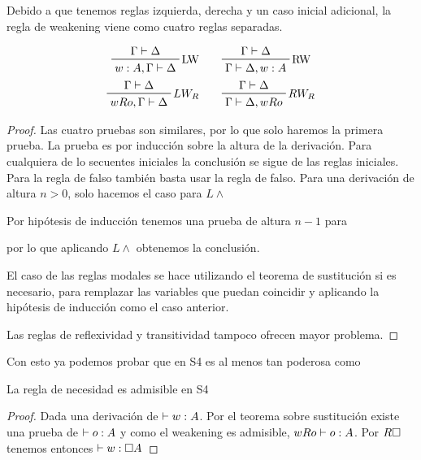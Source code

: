 Debido a que tenemos reglas izquierda, derecha y un caso inicial adicional, la regla de weakening viene como cuatro reglas separadas.

\begin{teo}
  \begin{align*}
    \tree{LW}{\Gamma \derives \Delta}{w:A, \Gamma \derives \Delta} \qquad & \tree{RW}{\Gamma \derives \Delta}{\Gamma \derives \Delta, w:A} \\ 
    \tree{$LW_R$}{\Gamma \derives \Delta}{wRo, \Gamma \derives \Delta} \qquad & \tree{$RW_R$}{\Gamma \derives \Delta}{\Gamma \derives \Delta, wRo} 
  \end{align*}
\end{teo}

\begin{proof}
  Las cuatro pruebas son similares, por lo que solo haremos la primera prueba.
  La prueba es por inducción sobre la altura de la derivación.
  Para cualquiera de lo secuentes iniciales la conclusión se sigue de las reglas iniciales. Para la regla de falso también basta usar la regla de falso. 
  Para una derivación de altura $n>0$, solo hacemos el caso para $L \land$


  Por hipótesis de inducción tenemos una prueba de altura $n-1$ para


  por lo que aplicando $L \land$ obtenemos la conclusión.

  El caso de las reglas modales se hace utilizando el teorema de sustitución si es necesario, para remplazar las variables que puedan coincidir y aplicando la hipótesis de inducción como el caso anterior.

  Las reglas de reflexividad y transitividad tampoco ofrecen mayor problema.
\end{proof}

Con esto ya podemos probar que en S4 es al menos tan poderosa como \K

\begin{teo}
  La regla de necesidad es admisible en S4
\end{teo}

\begin{proof}
  Dada una derivación de $\vdash w:A$. Por el teorema sobre sustitución existe una prueba de $\vdash o:A$ y como el weakening es admisible, $wRo \vdash o:A$. Por $R\square$ tenemos entonces $\vdash w:\square A$ 
\end{proof}
